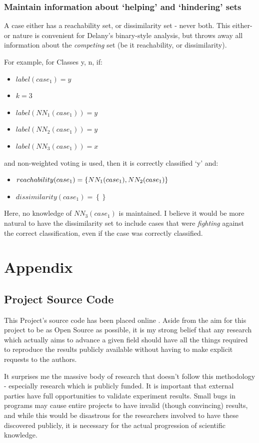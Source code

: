 \documentclass[a4paper,11pt]{report}
\begin{document}
\subsection{Maintain information about `helping' and `hindering' sets}
A case either has a reachability set, or dissimilarity set - never both. This either-or nature is convenient for Delany's binary-style analysis, but throws away all information about the \emph{competing} set (be it reachability, or dissimilarity).

For example, for Classes {y, n}, if:
\begin{itemize}
	\item $label(case_{1})=y$ 
	\item $k = 3$
	\item $label(NN_{1}(case_{1})) = y$ 
	\item $label(NN_{2}(case_{1})) = y$
	\item $label(NN_{3}(case_{1})) = x$  
\end{itemize}
and non-weighted voting is used, then it is correctly classified `y' and:
\begin{itemize}
	\item $reachability(case_{1})=\left\{ NN_{1}(case_{1}),\hphantom{}NN_{2}(case_{1})\right\} $
	\item $dissimilarity(case_{1})=\left\{ \right\} $
\end{itemize}

Here, no knowledge of $NN_{3}(case_{1})$ is maintained. I believe it would be more natural to have the dissimilarity set to include cases that were \emph{fighting} against the correct classification, even if the case was correctly classified.

\chapter{Appendix}
\section{Project Source Code}
This Project's source code has been placed online \citep{web:projectsourcecode}. Aside from the aim for this project to be as Open Source as possible, it is my strong belief that any research which actually aims to advance a given field should have all the things required to reproduce the results publicly available without having to make explicit requests to the authors. 

It surprises me the massive body of research that doesn't follow this methodology - especially research which is publicly funded. It is important that external parties have full opportunities to validate experiment results. Small bugs in programs may cause entire projects to have invalid (though convincing) results, and while this would be disastrous for the researchers involved to have these discovered publicly, it is necessary for the actual progression of scientific knowledge.
\end{document}
